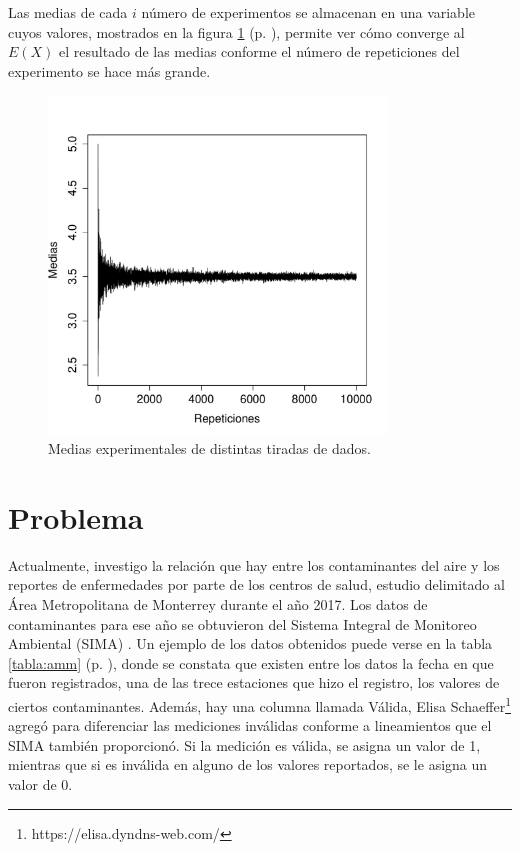 \documentclass[paper=leter, fontsize=11pt]{scrartcl}
\begin{document}
Las medias de cada $i$ número de experimentos se almacenan en una variable cuyos valores, mostrados en la figura \ref{fig:dados} (p. \pageref{fig:dados}), permite ver cómo converge al $E(X)$ el resultado de las medias conforme el número de repeticiones del experimento se hace más grande.

\begin{figure}
  \centering
  \includegraphics[width=0.8\textwidth]{dados.pdf}
\caption{Medias experimentales de distintas tiradas de dados.}
\label{fig:dados}
\end{figure}

\section{Problema}

Actualmente, investigo la relación que hay entre los contaminantes del aire y los reportes de enfermedades por parte de los centros de salud, estudio delimitado al Área Metropolitana de Monterrey durante el año 2017. Los datos de contaminantes para ese año se obtuvieron del Sistema Integral de Monitoreo Ambiental (SIMA) \cite{aireNL}. Un ejemplo de los datos obtenidos puede verse en la tabla \ref{tabla:amm} (p. \pageref{tabla:amm}), donde se constata que existen entre los datos la fecha en que fueron registrados, una de las trece estaciones que hizo el registro, los valores de ciertos contaminantes. Además, hay una columna llamada Válida, Elisa Schaeffer\footnote{https://elisa.dyndns-web.com/} agregó para diferenciar las mediciones inválidas conforme a lineamientos que el SIMA también proporcionó. Si la medición es válida, se asigna un valor de 1, mientras que si es inválida en alguno de los valores reportados, se le asigna un valor de 0.
\end{document}
